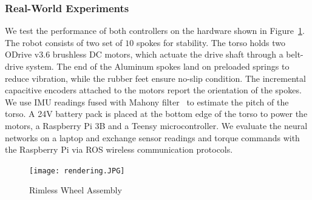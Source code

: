 \subsubsection{Real-World Experiments}

We test the performance of both controllers on the hardware shown in
Figure~\ref{fig:hardware}.
%
The robot consists of two set of $10$ spokes for stability.
%
The torso holds two ODrive v3.6 brushless DC motors, which actuate the drive
shaft through a belt-drive system.
%
The end of the Aluminum spokes land on preloaded springs to reduce vibration,
while the rubber feet ensure no-slip condition.
%
The incremental capacitive encoders attached to the motors report the
orientation of the spokes.
%
We use IMU readings fused with Mahony filter~\cite{mahony2008nonlinear} to estimate
the pitch of the torso.
%
A 24V battery pack is placed at the bottom edge of the torso to power
the motors, a Raspberry Pi 3B and a Teensy microcontroller.
%
We evaluate the neural networks on a laptop and exchange sensor readings and
torque commands with the Raspberry Pi via ROS wireless communication protocols.


\begin{figure}[H]
    \centering
    \texttt{[image: rendering.JPG]}
    \caption{Rimless Wheel Assembly}
    \label{fig:hardware}
\end{figure}